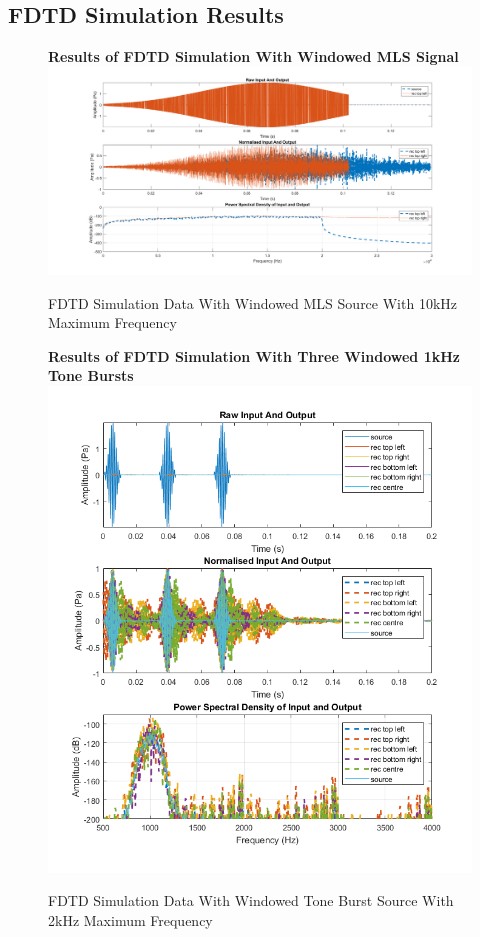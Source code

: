 \subsection{FDTD Simulation Results}

\begin{figure}[H]
\centering
\textbf{Results of FDTD Simulation With Windowed MLS Signal}
  \includegraphics[width=\textwidth]{./graphics/FDTDvalidationFinal.png}
  \caption{FDTD Simulation Data With Windowed MLS Source With 10kHz Maximum Frequency}
  \end{figure}
  \begin{figure}[H]
\centering
  \textbf{Results of FDTD Simulation With Three Windowed 1kHz Tone Bursts}
  \includegraphics[width=\textwidth]{./graphics/FDTDtoneburst1k.png}
  \caption{FDTD Simulation Data With Windowed Tone Burst Source With 2kHz Maximum Frequency}
\end{figure}

